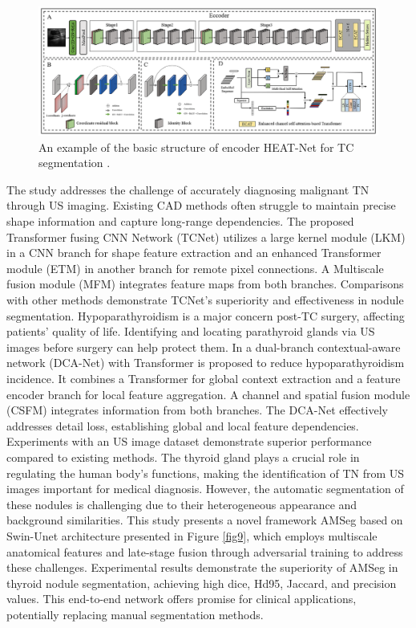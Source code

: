 \documentclass[a4paper,fleqn]{cas-sc}
\begin{document}
\begin{figure}[t!]
\centering
\includegraphics[width=1\columnwidth]{fig8.pdf}
\caption{An example of the basic structure of encoder HEAT-Net for TC segmentation \cite{jiang2023hybrid}.}
\label{fig8}
\end{figure}

The study \cite{li2023fusing} addresses the challenge of accurately diagnosing malignant \ac{TN} through \ac{US} imaging. Existing \ac{CAD} methods often struggle to maintain precise shape information and capture long-range dependencies. The proposed Transformer fusing CNN Network (TCNet) utilizes a large kernel module (LKM) in a CNN branch for shape feature extraction and an enhanced Transformer module (ETM) in another branch for remote pixel connections. A Multiscale fusion module (MFM) integrates feature maps from both branches. Comparisons with other methods demonstrate TCNet's superiority and effectiveness in nodule segmentation. Hypoparathyroidism is a major concern post-TC surgery, affecting patients' quality of life. Identifying and locating parathyroid glands via \ac{US} images before surgery can help protect them. In \cite{liu2023dca} a dual-branch contextual-aware network (DCA-Net) with Transformer is proposed to reduce hypoparathyroidism incidence. It combines a Transformer for global context extraction and a feature encoder branch for local feature aggregation. A channel and spatial fusion module (CSFM) integrates information from both branches. The DCA-Net effectively addresses detail loss, establishing global and local feature dependencies. Experiments with an \ac{US} image dataset demonstrate superior performance compared to existing methods. The thyroid gland plays a crucial role in regulating the human body's functions, making the identification of \ac{TN} from \ac{US} images important for medical diagnosis. However, the automatic segmentation of these nodules is challenging due to their heterogeneous appearance and background similarities. This study \cite{ma2023amseg} presents a novel framework AMSeg based on Swin-Unet architecture presented in Figure \ref{fig9}, which employs multiscale anatomical features and late-stage fusion through adversarial training to address these challenges. Experimental results demonstrate the superiority of AMSeg in thyroid nodule segmentation, achieving high dice, Hd95, Jaccard, and precision values. This end-to-end network offers promise for clinical applications, potentially replacing manual segmentation methods.
\end{document}
